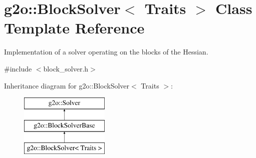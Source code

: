 \hypertarget{classg2o_1_1_block_solver}{}\section{g2o\+:\+:Block\+Solver$<$ Traits $>$ Class Template Reference}
\label{classg2o_1_1_block_solver}


Implementation of a solver operating on the blocks of the Hessian.  




{\ttfamily \#include $<$block\+\_\+solver.\+h$>$}

Inheritance diagram for g2o\+:\+:Block\+Solver$<$ Traits $>$\+:\begin{figure}[H]
\begin{center}
\leavevmode
\includegraphics[height=3.000000cm]{classg2o_1_1_block_solver}
\end{center}
\end{figure}
